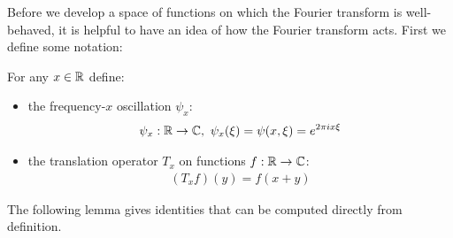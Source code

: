       Before we develop a space of functions on which the Fourier transform is well-behaved, it is helpful to have an idea of how the Fourier transform acts.
      First we define some notation:
      \begin{defn}
        For any $x\in\mathbb{R}$ define:
        \begin{itemize}
          \item the frequency-$x$ oscillation $\psi_x$:
            \begin{align*}
              \psi_x:\mathbb{R}\rightarrow\mathbb{C},\ \psi_x(\xi) = \psi(x,\xi) = e^{2\pi i x \xi}
            \end{align*}
          \item the translation operator $T_x$ on functions $f:\mathbb{R}\rightarrow\mathbb{C}$:
            \begin{align*}
              (T_xf)(y) = f(x+y)
            \end{align*}
        \end{itemize}
      \end{defn}
      The following lemma gives identities that can be computed directly from definition.
